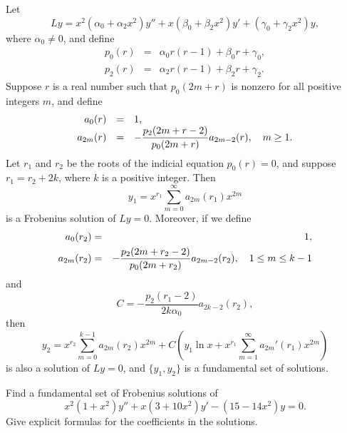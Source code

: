 \begin{theorem}
  \color{blue}
  \label{thmtype:7.7.2} Let
  \[
    Ly= x^{2}(\alpha_{0}+\alpha_{2}x^{2})y''+x(\beta_{0}+\beta_{2}x^{2})y' +(\gamma_{0}+\gamma_{2}x^{2})y,
  \]
  where $\alpha_{0}\ne0$, and define
  \begin{eqnarray*}
    p_{0}(r) & = & \alpha_{0}r(r-1)+\beta_{0}r+\gamma_{0}, \\[5pt]
    p_{2}(r) & = & \alpha_{2}r(r-1)+\beta_{2}r+\gamma_{2}.
  \end{eqnarray*}
  Suppose $r$ is a real number such that $p_{0}(2m+r)$ is nonzero for all positive integers $m$, and
  define
  \begin{equation}
    \label{eq:7.7.22}
    \begin{array}{rcl}
      a_{0}(r)  & = & 1,                                                             \\
      a_{2m}(r) & = & -\displaystyle\frac{p_{2}(2m+r-2)}{p_{0}(2m+r)}a_{2m-2}(r),\quad m\ge1.
    \end{array}
  \end{equation}
  Let $r_{1}$ and $r_{2}$ be the roots of the indicial equation $p_{0}(r)=0$, and suppose
  $r_{1}=r_{2}+2k$, where $k$ is a positive integer. Then
  \[
    y_{1}=x^{r_{1}}\sum_{m=0}^{\infty}a_{2m}(r_{1})x^{2m}
  \]
  is a Frobenius solution of $Ly=0$. Moreover, if we define
  \begin{eqnarray*}
    a_{0}(r_{2})  & = & 1, \\
    a_{2m}(r_{2}) & = & -\displaystyle\frac{p_{2}(2m+r_{2}-2)}{p_{0}(2m+r_{2})}a_{2m-2}(r_{2}),\quad1\le m\le k-1
  \end{eqnarray*}
  and
  \begin{equation}
    \label{eq:7.7.23}C=-\frac{p_{2}(r_{1}-2)}{2k\alpha_{0}}a_{2k-2}(r_{2}),
  \end{equation}
  then
  \begin{equation}
    \label{eq:7.7.24}y_{2}=x^{r_{2}}\sum_{m=0}^{k-1}a_{2m}(r_{2})x^{2m}+C\left(y_{1}\ln x+x^{r_{1}}\sum_{m=1}^{\infty}a_{2m}'(r_{1})x^{2m}\right)
  \end{equation}
  is also a solution of $Ly=0$, and $\{y_{1},y_{2}\}$ is a fundamental set of solutions.
\end{theorem}

\begin{example}
  \label{example:7.7.3} \rm Find a fundamental set of Frobenius solutions of
  \[
    x^{2}(1+x^{2})y''+x(3+10x^{2})y'-(15-14x^{2})y=0.
  \]
  Give explicit formulas for the coefficients in the solutions.
\end{example}

